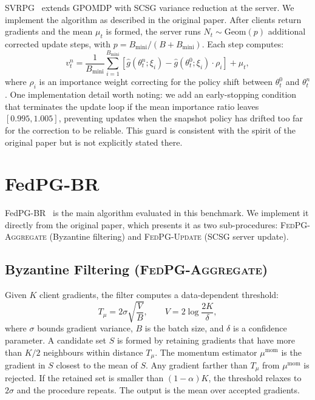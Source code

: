 \documentclass[a4paper, oneside]{discothesis}
\begin{document}
SVRPG~\cite{SVRPG} extends GPOMDP with SCSG variance reduction at the server. We implement the algorithm as described in the original paper. After clients return gradients and the mean $\mu_t$ is formed, the server runs $N_t \sim \text{Geom}(p)$ additional corrected update steps, with $p = B_{\text{mini}} / (B + B_{\text{mini}})$. Each step computes:
\begin{equation}
    v_t^n = \frac{1}{B_{\text{mini}}} \sum_{i=1}^{B_{\text{mini}}} \left[ \hat{g}(\theta_t^n; \xi_i) - \hat{g}(\theta_t^0; \xi_i) \cdot \rho_i \right] + \mu_t,
\end{equation}
where $\rho_i$ is an importance weight correcting for the policy shift between $\theta_t^0$ and $\theta_t^n$. One implementation detail worth noting: we add an early-stopping condition that terminates the update loop if the mean importance ratio leaves $[0.995, 1.005]$, preventing updates when the snapshot policy has drifted too far for the correction to be reliable. This guard is consistent with the spirit of the original paper but is not explicitly stated there.

\section{FedPG-BR}
\label{sec:fedpgbr}

FedPG-BR~\cite{FedPGBR} is the main algorithm evaluated in this benchmark. We implement it directly from the original paper, which presents it as two sub-procedures: \textsc{FedPG-Aggregate} (Byzantine filtering) and \textsc{FedPG-Update} (SCSG server update).

\subsection{Byzantine Filtering (\textsc{FedPG-Aggregate})}

Given $K$ client gradients, the filter computes a data-dependent threshold:
\begin{equation}
    T_\mu = 2\sigma \sqrt{\frac{V}{B}}, \qquad V = 2 \log \frac{2K}{\delta},
\end{equation}
where $\sigma$ bounds gradient variance, $B$ is the batch size, and $\delta$ is a confidence parameter. A candidate set $S$ is formed by retaining gradients that have more than $K/2$ neighbours within distance $T_\mu$. The momentum estimator $\mu^{\text{mom}}$ is the gradient in $S$ closest to the mean of $S$. Any gradient farther than $T_\mu$ from $\mu^{\text{mom}}$ is rejected. If the retained set is smaller than $(1-\alpha)K$, the threshold relaxes to $2\sigma$ and the procedure repeats. The output is the mean over accepted gradients.
\end{document}
